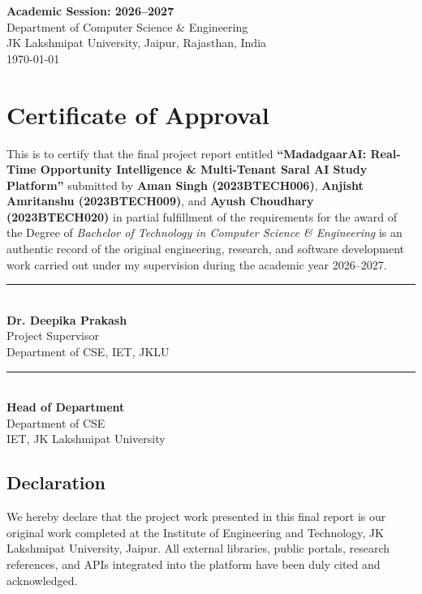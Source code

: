 \documentclass[12pt,a4paper,oneside]{report}
\begin{document}
\begin{titlepage}
    \vfill

    {\large \textbf{Academic Session: 2026--2027}}\\[0.2cm]
    {\normalsize Department of Computer Science \& Engineering}\\[0.1cm]
    {\normalsize JK Lakshmipat University, Jaipur, Rajasthan, India}\\[0.4cm]
    {\normalsize \today}
\end{titlepage}

\chapter*{Certificate of Approval}
\thispagestyle{plain}
This is to certify that the final project report entitled \textbf{``MadadgaarAI: Real-Time Opportunity Intelligence \& Multi-Tenant Saral AI Study Platform''} submitted by \textbf{Aman Singh (2023BTECH006)}, \textbf{Anjisht Amritanshu (2023BTECH009)}, and \textbf{Ayush Choudhary (2023BTECH020)} in partial fulfillment of the requirements for the award of the Degree of \textit{Bachelor of Technology in Computer Science \& Engineering} is an authentic record of the original engineering, research, and software development work carried out under my supervision during the academic year 2026--2027.

\vspace{2.5cm}

\noindent
\begin{minipage}{0.45\textwidth}
    \rule{\textwidth}{0.4pt}\\
    \textbf{Dr. Deepika Prakash}\\
    Project Supervisor\\
    Department of CSE, IET, JKLU
\end{minipage}
\hfill
\begin{minipage}{0.45\textwidth}
    \rule{\textwidth}{0.4pt}\\
    \textbf{Head of Department}\\
    Department of CSE\\
    IET, JK Lakshmipat University
\end{minipage}

\vspace{2.0cm}

\section*{Declaration}
We hereby declare that the project work presented in this final report is our original work completed at the Institute of Engineering and Technology, JK Lakshmipat University, Jaipur. All external libraries, public portals, research references, and APIs integrated into the platform have been duly cited and acknowledged.
\end{document}
